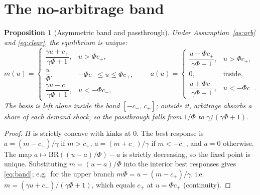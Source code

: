 \documentclass[11pt,a4paper]{article}
\theoremstyle{plain}
\newtheorem{proposition}{Proposition}
\theoremstyle{definition}
\theoremstyle{remark}
\begin{document}
\section{The no-arbitrage band}\label{sec:band}
\begin{proposition}[Asymmetric band and passthrough]\label{prop:band}
Under Assumption~\ref{as:arb} and \eqref{eq:clear}, the equilibrium is unique:
\begin{equation}\label{eq:band}
m(u)=\begin{cases}
\dfrac{\gamma u + c_+}{\gamma\Phi+1}, & u>\Phi c_+,\\[2mm]
\dfrac{u}{\Phi}, & -\Phi c_-\le u\le \Phi c_+,\\[2mm]
\dfrac{\gamma u - c_-}{\gamma\Phi+1}, & u<-\Phi c_- ,
\end{cases}
\qquad
a(u)=\begin{cases}\dfrac{u-\Phi c_+}{\gamma\Phi+1}, & u>\Phi c_+,\\[1mm] 0, & \text{inside},\\[1mm] \dfrac{u+\Phi c_-}{\gamma\Phi+1}, & u<-\Phi c_-.\end{cases}
\end{equation}
The basis is left alone inside the band $[-c_-,\,c_+]$; outside it, arbitrage absorbs a share of each demand shock, so
the passthrough falls from $1/\Phi$ to $\gamma/(\gamma\Phi+1)$.
\end{proposition}
\begin{proof}
$\Pi$ is strictly concave with kinks at $0$. The best response is $a=(m-c_+)/\gamma$ if $m>c_+$, $a=(m+c_-)/\gamma$ if
$m<-c_-$, and $a=0$ otherwise. The map $a\mapsto \mathrm{BR}((u-a)/\Phi)-a$ is strictly decreasing, so the fixed point is
unique. Substituting $m=(u-a)/\Phi$ into the interior best responses gives \eqref{eq:band}; e.g.\ for the upper branch
$m\Phi=u-(m-c_+)/\gamma$, i.e.\ $m=(\gamma u+c_+)/(\gamma\Phi+1)$, which equals $c_+$ at $u=\Phi c_+$ (continuity).
\end{proof}
\end{document}
